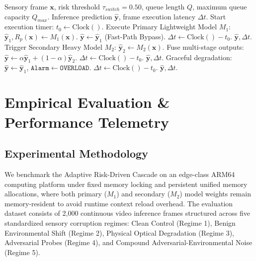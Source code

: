 \documentclass[conference]{IEEEtran}
\begin{document}
\begin{algorithm}[t]
\caption{Adaptive Risk-Driven Edge Cascade Routing}
\label{alg:cascade_routing}
\begin{algorithmic}[1]
\REQUIRE Sensory frame $\mathbf{x}$, risk threshold $\tau_{switch} = 0.50$, queue length $Q$, maximum queue capacity $Q_{max}$.
\ENSURE Inference prediction $\hat{\mathbf{y}}$, frame execution latency $\Delta t$.
\STATE Start execution timer: $t_0 \leftarrow \mathrm{Clock}()$.
\STATE Execute Primary Lightweight Model $M_1$: $\hat{\mathbf{y}}_1, R_p(\mathbf{x}) \leftarrow M_1(\mathbf{x})$.
    \STATE $\hat{\mathbf{y}} \leftarrow \hat{\mathbf{y}}_1$ (Fast-Path Bypass).
    \STATE $\Delta t \leftarrow \mathrm{Clock}() - t_0$.
    \RETURN $\hat{\mathbf{y}}, \Delta t$.
    \STATE Trigger Secondary Heavy Model $M_2$: $\hat{\mathbf{y}}_2 \leftarrow M_2(\mathbf{x})$.
    \STATE Fuse multi-stage outputs: $\hat{\mathbf{y}} \leftarrow \alpha \hat{\mathbf{y}}_1 + (1 - \alpha) \hat{\mathbf{y}}_2$.
    \STATE $\Delta t \leftarrow \mathrm{Clock}() - t_0$.
    \RETURN $\hat{\mathbf{y}}, \Delta t$.
\ELSE
    \STATE Graceful degradation: $\hat{\mathbf{y}} \leftarrow \hat{\mathbf{y}}_1$, $\mathtt{Alarm} \leftarrow \mathtt{OVERLOAD}$.
    \STATE $\Delta t \leftarrow \mathrm{Clock}() - t_0$.
    \RETURN $\hat{\mathbf{y}}, \Delta t$.
\ENDIF
\end{algorithmic}
\end{algorithm}

\section{Empirical Evaluation \& Performance Telemetry}
\subsection{Experimental Methodology}
We benchmark the Adaptive Risk-Driven Cascade on an edge-class ARM64 computing platform under fixed memory locking and persistent unified memory allocations, where both primary ($M_1$) and secondary ($M_2$) model weights remain memory-resident to avoid runtime context reload overhead. The evaluation dataset consists of 2,000 continuous video inference frames structured across five standardized sensory corruption regimes: Clean Control (Regime 1), Benign Environmental Shift (Regime 2), Physical Optical Degradation (Regime 3), Adversarial Probes (Regime 4), and Compound Adversarial-Environmental Noise (Regime 5).
\end{document}
